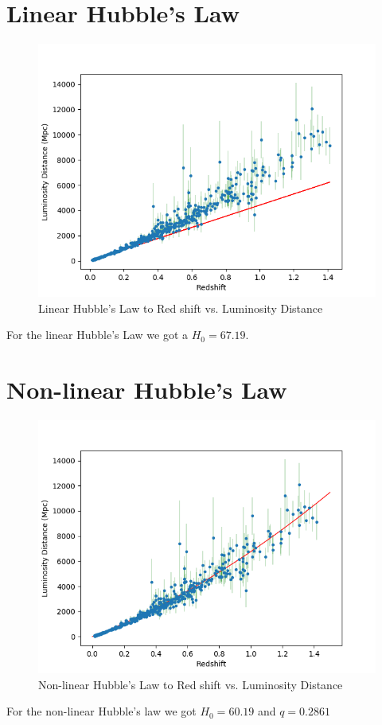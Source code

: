 \documentclass{article}
\begin{document}
\section{Linear Hubble's Law}
\begin{figure}[H]
    \centering
    \includegraphics[width = \textwidth]{Images/linfit.png}
    \caption{Linear Hubble's Law to Red shift vs. Luminosity Distance}
    \label{fig:linfit}
\end{figure}
For the linear Hubble's Law we got a $H_0 = 67.19$. 

\section{Non-linear Hubble's Law}
\begin{figure}[H]
    \centering
    \includegraphics[width = \textwidth]{Images/nonlinfit.png}
    \caption{Non-linear Hubble's Law to Red shift vs. Luminosity Distance}
    \label{fig:nonlinfit}
\end{figure}
For the non-linear Hubble's law we got $H_0 = 60.19$ and $q = 0.2861$
\end{document}
